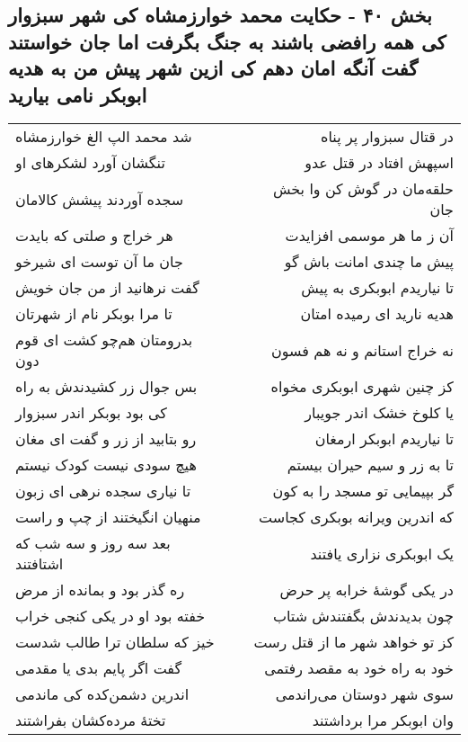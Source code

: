 \begin{center}
\section*{بخش ۴۰ - حکایت محمد خوارزمشاه کی شهر سبزوار کی همه رافضی باشند به جنگ بگرفت اما جان خواستند گفت آنگه امان دهم کی ازین شهر پیش من به هدیه ابوبکر نامی بیارید}
\label{sec:sh040}
\begin{longtable}{l p{0.5cm} r}
شد محمد الپ الغ خوارزمشاه
&&
در قتال سبزوار پر پناه
\\
تنگشان آورد لشکرهای او
&&
اسپهش افتاد در قتل عدو
\\
سجده آوردند پیشش کالامان
&&
حلقه‌مان در گوش کن وا بخش جان
\\
هر خراج و صلتی که بایدت
&&
آن ز ما هر موسمی افزایدت
\\
جان ما آن توست ای شیرخو
&&
پیش ما چندی امانت باش گو
\\
گفت نرهانید از من جان خویش
&&
تا نیاریدم ابوبکری به پیش
\\
تا مرا بوبکر نام از شهرتان
&&
هدیه نارید ای رمیده امتان
\\
بدرومتان هم‌چو کشت ای قوم دون
&&
نه خراج استانم و نه هم فسون
\\
بس جوال زر کشیدندش به راه
&&
کز چنین شهری ابوبکری مخواه
\\
کی بود بوبکر اندر سبزوار
&&
یا کلوخ خشک اندر جویبار
\\
رو بتابید از زر و گفت ای مغان
&&
تا نیاریدم ابوبکر ارمغان
\\
هیچ سودی نیست کودک نیستم
&&
تا به زر و سیم حیران بیستم
\\
تا نیاری سجده نرهی ای زبون
&&
گر بپیمایی تو مسجد را به کون
\\
منهیان انگیختند از چپ و راست
&&
که اندرین ویرانه بوبکری کجاست
\\
بعد سه روز و سه شب که اشتافتند
&&
یک ابوبکری نزاری یافتند
\\
ره گذر بود و بمانده از مرض
&&
در یکی گوشهٔ خرابه پر حرض
\\
خفته بود او در یکی کنجی خراب
&&
چون بدیدندش بگفتندش شتاب
\\
خیز که سلطان ترا طالب شدست
&&
کز تو خواهد شهر ما از قتل رست
\\
گفت اگر پایم بدی یا مقدمی
&&
خود به راه خود به مقصد رفتمی
\\
اندرین دشمن‌کده کی ماندمی
&&
سوی شهر دوستان می‌راندمی
\\
تختهٔ مرده‌کشان بفراشتند
&&
وان ابوبکر مرا برداشتند
\\

\end{longtable}
\end{center}
